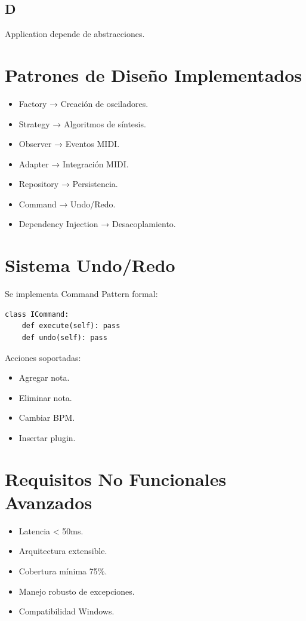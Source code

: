 \documentclass[12pt]{article}
\begin{document}
\subsection{D}
Application depende de abstracciones.

\section{Patrones de Diseño Implementados}

\begin{itemize}
    \item Factory → Creación de osciladores.
    \item Strategy → Algoritmos de síntesis.
    \item Observer → Eventos MIDI.
    \item Adapter → Integración MIDI.
    \item Repository → Persistencia.
    \item Command → Undo/Redo.
    \item Dependency Injection → Desacoplamiento.
\end{itemize}

\section{Sistema Undo/Redo}

Se implementa Command Pattern formal:

\begin{lstlisting}
class ICommand:
    def execute(self): pass
    def undo(self): pass
\end{lstlisting}

Acciones soportadas:
\begin{itemize}
    \item Agregar nota.
    \item Eliminar nota.
    \item Cambiar BPM.
    \item Insertar plugin.
\end{itemize}

\section{Requisitos No Funcionales Avanzados}

\begin{itemize}
    \item Latencia < 50ms.
    \item Arquitectura extensible.
    \item Cobertura mínima 75\%.
    \item Manejo robusto de excepciones.
    \item Compatibilidad Windows.
\end{itemize}
\end{document}
